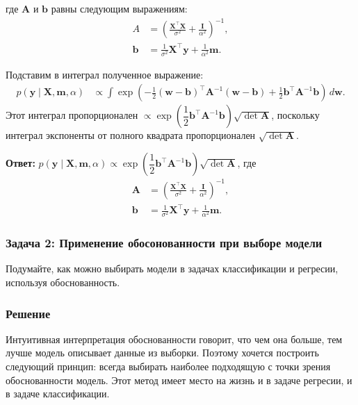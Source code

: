 где $\mathbf{A}$ и $\mathbf{b}$ равны следующим выражениям:
\begin{align*}
    A          & = \left(\frac{\mathbf{X}^\top \mathbf{X}}{\sigma^2} + \frac{\mathbf{I}}{\alpha^2}\right)^{-1}, \\
    \mathbf{b} & = \frac{1}{\sigma^2} \mathbf{X}^\top \mathbf{y} + \frac{1}{\alpha^2} \mathbf{m}.
\end{align*}

Подставим в интеграл полученное выражение:
\begin{align*}
    p(\mathbf{y} \mid \mathbf{X}, \mathbf{m}, \alpha) & \propto \int \exp\left(-\frac{1}{2}(\mathbf{w} - \mathbf{b})^\top \mathbf{A}^{-1} (\mathbf{w} - \mathbf{b}) + \frac{1}{2} \mathbf{b}^\top \mathbf{A}^{-1} \mathbf{b} \right) \, d\mathbf{w}.
\end{align*}
Этот интеграл пропорционален $\propto\exp\left(\dfrac{1}{2} \mathbf{b}^\top \mathbf{A}^{-1} \mathbf{b}\right) \sqrt{\det \mathbf{A}}$, поскольку интеграл экспоненты от полного квадрата пропорционален $\sqrt{\det \mathbf{A}}$.

\textbf{Ответ:} $p(\mathbf{y} \mid \mathbf{X}, \mathbf{m}, \alpha) \propto\exp\left(\dfrac{1}{2} \mathbf{b}^\top \mathbf{A}^{-1} \mathbf{b}\right) \sqrt{\det \mathbf{A}}$, где
\begin{align*}
    \mathbf{A} & = \left(\frac{\mathbf{X}^\top \mathbf{X}}{\sigma^2} + \frac{\mathbf{I}}{\alpha^2}\right)^{-1}, \\
    \mathbf{b} & = \frac{1}{\sigma^2} \mathbf{X}^\top \mathbf{y} + \frac{1}{\alpha^2} \mathbf{m}.
\end{align*}

\subsubsection{Задача 2: Применение обосонованности при выборе модели}
Подумайте, как можно выбирать модели в задачах классификации и регресии, используя обоснованность.
\subsubsection{Решение}

Интуитивная интерпретация обоснованности говорит, что чем она больше, тем лучше модель описывает данные из выборки. Поэтому хочется построить следующий принцип: всегда выбирать наиболее подходящую с точки зрения обоснованности модель. Этот метод имеет место на жизнь и в задаче регресии, и в задаче классификации.

